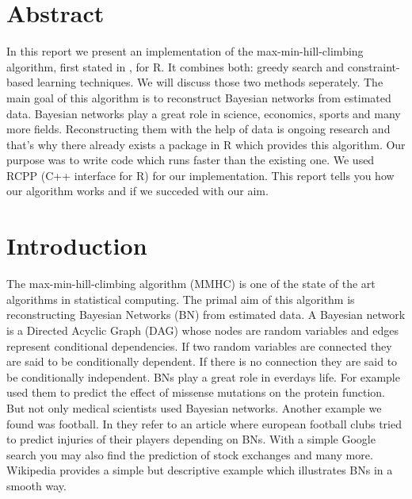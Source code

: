 \pagestyle{useheadings} 

\tableofcontents
\listoffigures

\chapter*{Abstract}

In this report we present an implementation of the max-min-hill-climbing algorithm, first stated in \cite{TBA}, for R. It combines both: greedy search and constraint-based learning techniques. We will discuss those two methods seperately. The main goal of this algorithm is to reconstruct Bayesian networks from estimated data. Bayesian networks play a great role in science, economics, sports and many more fields. Reconstructing them with the help of data is ongoing research and that's why there already exists a package in R which provides this algorithm. Our purpose was to write code which runs faster than the existing one. We used RCPP (C++ interface for R) for our implementation. This report tells you how our algorithm works and if we succeded with our aim.

\chapter{Introduction}

The max-min-hill-climbing algorithm (MMHC) is one of the state of the art algorithms in statistical computing. The primal aim of this algorithm is reconstructing Bayesian Networks (BN) from estimated data. A Bayesian network is a Directed Acyclic Graph (DAG) whose nodes are random variables and edges represent conditional dependencies. If two random variables are connected they are said to be conditionally dependent. If there is no connection they are said to be conditionally independent. BNs play a great role in everdays life. For example \cite{NBBCW} used them to predict the effect of missense mutations on the protein function. But not only medical scientists used Bayesian networks. Another example we found was football. In \cite{PKA} they refer to an article where european football clubs tried to predict injuries of their players depending on BNs. With a simple Google search you may also find the prediction of stock exchanges and many more. Wikipedia provides a simple but descriptive example which illustrates BNs in a smooth way.


